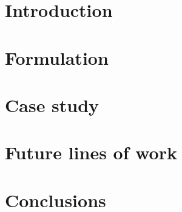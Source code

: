 \documentclass[10pt, a4paper]{report}
\begin{document}
\tableofcontents{}

\chapter{Introduction}


\chapter{Formulation}


\chapter{Case study}


\chapter{Future lines of work}


\chapter{Conclusions}


\printbibliography
\end{document}
